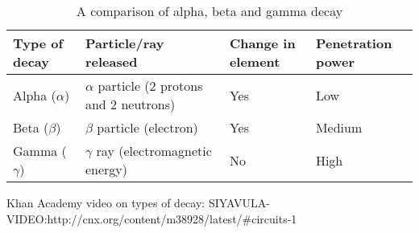 \begin{table}[h]
\begin{center}
\caption{A comparison of alpha, beta and gamma decay}
\label{tab:radiation type summary}
\begin{tabular}{|l|l|p{2cm}|p{2cm}|}\hline
\textbf{Type of decay} & \textbf{Particle/ray released} & \textbf{Change in element} & \textbf{Penetration power} \\\hline
Alpha ($\alpha$) & $\alpha$ particle (2 protons and 2 neutrons) & Yes & Low \\\hline
Beta ($\beta$) & $\beta$ particle (electron)  &  Yes & Medium \\\hline
Gamma ($\gamma$) & $\gamma$ ray (electromagnetic energy) & No & High \\\hline
\end{tabular}
\end{center}
\end{table}
Khan Academy video on types of decay: SIYAVULA-VIDEO:http://cnx.org/content/m38928/latest/#circuits-1
